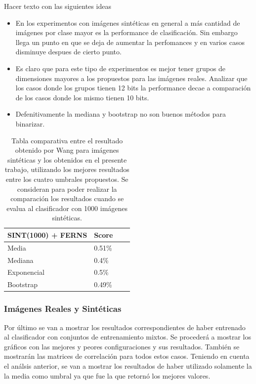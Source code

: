 \newpage

	Hacer texto con las siguientes ideas
	\begin{itemize}
		\item En los experimentos con imágenes sintéticas en general a más cantidad de imágenes por clase mayor es la performance de clasificación. Sin embargo llega un punto en que se deja de aumentar la perfomances y en varios casos disminuye despues de cierto punto.
		\item Es claro que para este tipo de experimentos es mejor tener grupos de dimensiones mayores a los propuestos para las imágenes reales. Analizar que los casos donde los grupos tienen 12 bits la performance decae a comparación de los casos donde los mismo tienen 10 bits.
		\item Defenitivamente la mediana y bootstrap no son buenos métodos para binarizar.
	\end{itemize}

	\begin{table}
		\centering
		\begin{tabular}{ | l | l | l | p{5cm} |}
    			\hline
    				\textbf{SINT(1000) + FERNS} & \textbf{Score} \\ \hline
    				Media & 0.51\% \\ \hline
    				Mediana & 0.4\%\\ \hline
    				Exponencial & 0.5\% \\ \hline
    				Bootstrap & 0.49\%\\ 
    			\hline
    		\end{tabular}
    		\caption[Resultados imágenes sintéticas vs Wang]{Tabla comparativa entre el resultado obtenido por Wang para imágenes sintéticas y los obtenidos en el presente trabajo, utilizando los mejores resultados entre los cuatro umbrales propuestos. Se consideran para poder realizar la comparación los resultados cuando se evalua al clasificador con 1000 imágenes sintéticas.}
    	\end{table}
			
\newpage
    	\subsubsection{Imágenes Reales y Sintéticas}
    	
	Por último se van a mostrar los resultados correspondientes de haber entrenado al clasificador con conjuntos de entrenamiento mixtos. Se procederá a mostrar los gráficos con las mejores y peores configuraciones y sus resultados. También se mostrarán las matrices de correlación para todos estos casos. Teniendo en cuenta el análsis anterior, se van a mostrar los resultados de haber utilizado solamente la la media como umbral ya que fue la que retornó los mejores valores.
	
